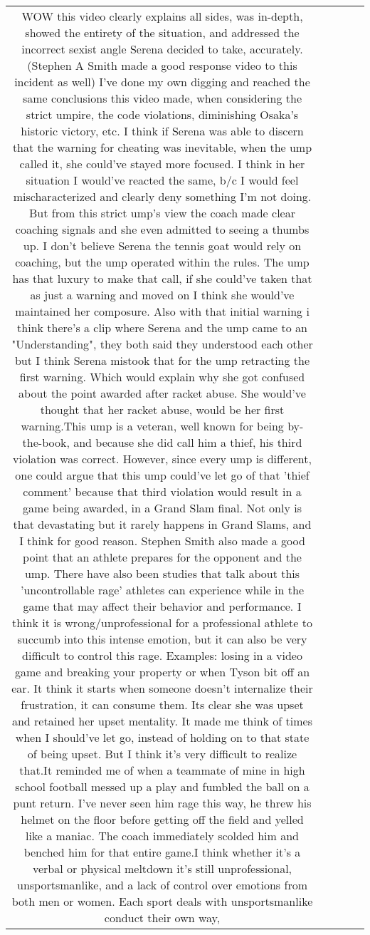 \documentclass[11pt]{article}
\newlength\mylength
\begin{document}
\begin{center}
\begin{longtable}{|C{.65\mylength}|C{.30\mylength}|C{.12\mylength}|C{.12\mylength}|C{.12\mylength}|}
  \small WOW this video clearly explains all sides, was in-depth, showed the entirety of the situation, and addressed the incorrect sexist angle Serena decided to take, accurately. (Stephen A Smith made a good response video to this incident as well) I've done my own digging and reached the same conclusions this video made, when considering the strict umpire, the code violations, diminishing Osaka's historic victory, etc. I think if Serena was able to discern that the warning for cheating was inevitable, when the ump called it, she could've stayed more focused. I think in her situation I would've reacted the same, b/c I would feel mischaracterized and clearly deny something I'm not doing. But from this strict ump's view the coach made clear coaching signals and she even admitted to seeing a thumbs up. I don't believe Serena the tennis goat would rely on coaching, but the ump operated within the rules. The ump has that luxury to make that call, if she could've taken that as just a warning and moved on I think she would've maintained her composure. Also with that initial warning i think there's a clip where Serena and the ump came to an "Understanding", they both said they understood each other but I think Serena mistook that for the ump retracting the first warning. Which would explain why she got confused about the point awarded after racket abuse. She would've thought that her racket abuse, would be her first warning.This ump is a veteran, well known for being by-the-book, and because she did call him a thief, his third violation was correct. However, since every ump is different, one could argue that this ump could've let go of that 'thief comment' because that third violation would result in a game being awarded, in a Grand Slam final. Not only is that devastating but it rarely happens in Grand Slams, and I think for good reason. Stephen Smith also made a good point that an athlete prepares for the opponent and the ump. There have also been studies that talk about this 'uncontrollable rage' athletes can experience while in the game that may affect their behavior and performance. I think it is wrong/unprofessional for a professional athlete to succumb into this intense emotion, but it can also be very difficult to control this rage. Examples: losing in a video game and breaking your property or when Tyson bit off an ear. It think it starts when someone doesn't internalize their frustration, it can consume them. Its clear she was upset and retained her upset mentality. It made me think of times when I should've let go, instead of holding on to that state of being upset. But I think it's very difficult to realize that.It reminded me of when a teammate of mine in high school football messed up a play and fumbled the ball on a punt return. I've never seen him rage this way, he threw his helmet on the floor before getting off the field and yelled like a maniac. The coach immediately scolded him and benched him for that entire game.I think whether it's a verbal or physical meltdown it's still unprofessional, unsportsmanlike, and a lack of control over emotions from both men or women. Each sport deals with unsportsmanlike conduct their own way, 
\end{longtable}
\end{center}
\end{document}
